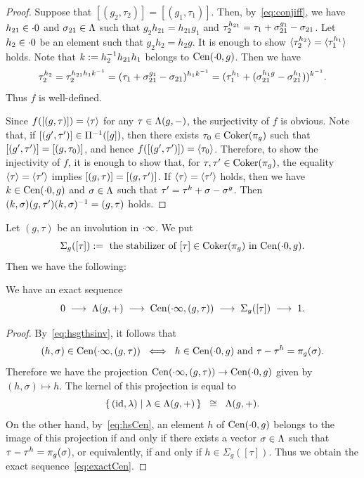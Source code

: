 \documentclass{amsart} %
\begin{document}
%
\begin{proof}
Suppose that $[(g_2, \tau_2)]=[(g_1, \tau_1)] $.
Then, by~\eqref{eq:conjiff}, we have $h_{21}\in \cdot 0$ and $\sigma_{21}\in \Lambda$ 
such that $g_2 h_{21}=h_{21} g_1$
and $\tau_2\sp{h_{21}}=\tau_1 +\sigma_{21}\sp{g_1}-\sigma_{21}$.
Let $h_2\in \cdot 0 $ be an element 
such that $g_2 h_2=h_2 g $.
It is enough to show 
$\langle {\tau_2^{ h_2}} \rangle=\langle {\tau_1^{h_1}} \rangle$ holds.
Note that $k:=h_2^{-1} h_{21} h_1$ belongs to $\mathrm{Cen}(\cdot 0, g)$.
Then we have 
\[
\tau_2^{ h_2}=\tau_2^{ h_{21} h_1 k^{-1}}
=(\tau_1 +\sigma_{21}\sp{g_1}-\sigma_{21})^{ h_1 k^{-1}}
=(\tau_1\sp{ h_1}+(\sigma_{21}\sp{h_1 g}-\sigma_{21}\sp{h_1}))^{k^{-1}}.
\]
Thus $f$ is well-defined.
\par
Since $f([(g, \tau)])=\langle {\tau} \rangle$ for any $\tau\in \Lambda (g, -)$, 
the surjectivity of $f$ is obvious.
Note that, if $[(g^{\prime}, \tau^{\prime})]\in \Pi^{-1}([g])$,
then there exists $\tau_0\in \operatorname{Coker}(\pi_{g})$ such that 
$[(g^{\prime}, \tau^{\prime})]=[(g, \tau_0)]$, 
and hence
$f([(g^{\prime}, \tau^{\prime})])=\langle {\tau_0} \rangle$.
Therefore, to show the injectivity of $f$,
it is enough to show that, 
for $\tau, \tau^{\prime}\in \operatorname{Coker}(\pi_{g})$,
the equality $\langle {\tau} \rangle=\langle {\tau^{\prime}} \rangle$ implies 
$[(g, \tau)]=[(g, \tau^{\prime})]$.
If $\langle {\tau} \rangle=\langle {\tau^{\prime}} \rangle$ holds,
then we have $k\in \mathrm{Cen}(\cdot 0, g)$ and $\sigma\in \Lambda$
such that $\tau^{\prime}=\tau^k+\sigma-\sigma^g$.
Then $(k, \sigma)(g, \tau^{\prime})(k, \sigma)^{-1}=(g, \tau)$ holds.
%
\end{proof}
%
%
%
Let $(g, \tau)$ be an involution in $\cdot \infty$.
We put
\[
\Sigma_g([\tau]) :=
\textrm{ the stabilizer of $[\tau]\in \operatorname{Coker}(\pi_{g})$ in $\mathrm{Cen}(\cdot 0, g)$}.
\]
Then we have the following:
%
\begin{proposition}\label{prop:exactCen}
We have an exact sequence 
%
\begin{equation}\label{eq:exactCen}
0 \;\longrightarrow\; \Lambda(g, +)\;\longrightarrow\; \mathrm{Cen}(\cdot \infty, (g, \tau)) 
\;\longrightarrow\;\Sigma_g([\tau]) \;\longrightarrow\; 1.
\end{equation}
%
\end{proposition}
%
\begin{proof}
By~\eqref{eq:hsgthsinv}, it follows that 
%
\begin{equation}\label{eq:hsCen}
(h, \sigma)\in \mathrm{Cen}(\cdot \infty, (g, \tau))
\;\; \Longleftrightarrow\;\; 
\textrm{$h\in \mathrm{Cen}(\cdot 0, g)$ and $\tau-\tau^h=\pi_{g}(\sigma)$}.
\end{equation}
%
Therefore we have the projection 
$\mathrm{Cen}(\cdot \infty, (g, \tau))\to \mathrm{Cen}(\cdot 0, g)$
given by $(h, \sigma)\mapsto h$.
The kernel of this projection is equal to 
\[
\{\,{(\mathord{\mathrm{id}}, \lambda)}\mid {\lambda\in \Lambda(g, +)} \,\}\;\;\cong\;\; \Lambda(g, +).
\]
On the other hand, by~\eqref{eq:hsCen}, 
an element $h$ of $\mathrm{Cen}(\cdot 0, g)$
belongs to the image of this projection if and only if 
there exists a vector $\sigma\in \Lambda$ such that 
$\tau-\tau^h=\pi_{g}(\sigma)$, or equivalently, if and only if 
$h\in \Sigma_g([\tau]) $.
Thus we obtain the exact sequence~\eqref{eq:exactCen}.
\end{proof}
%
%
\end{document}
